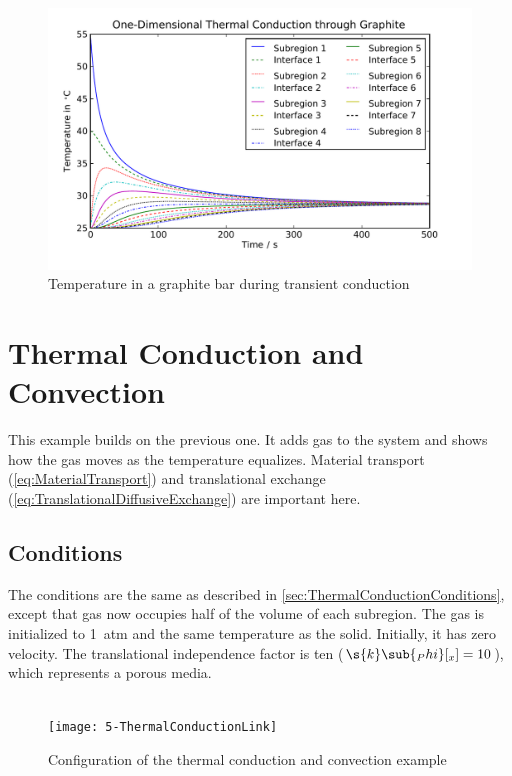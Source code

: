 \begin{figure}[htbp]
  \includegraphics[width=\linewidth]{Results/Basic/ThermalConduction/Temperature}%
  \caption{Temperature in a graphite bar during transient conduction}%
  \label{fig:ThermalConductionTemperature}
\end{figure}


\FloatBarrier %
\section{Thermal Conduction and Convection}
\label{sec:ThermalConductionConvection}

This example builds on the previous one.  It adds gas to the system and shows how the gas moves as the temperature equalizes.  Material transport (\autoref{eq:MaterialTransport}) and translational exchange (\autoref{eq:TranslationalDiffusiveExchange}) are important here.

\subsection{Conditions}

The conditions are the same as described in \autoref{sec:ThermalConductionConditions}, except that  gas now occupies half of the volume of each subregion.  The gas is initialized to \SI{1}{atm} and the same temperature as the solid.  Initially, it has zero velocity.  The translational independence factor is ten ($\s{k}\sub{_Phi}[_x] = 10$), which represents a porous media.

\begin{figure}[htbp]
  \vspace*{-1.72cm}\\\texttt{[image: 5-ThermalConductionLink]}\vspace*{-1cm}\\
  \caption{Configuration of the thermal conduction and convection example}
  \label{fig:ThermalConductionConvection}
\end{figure}


